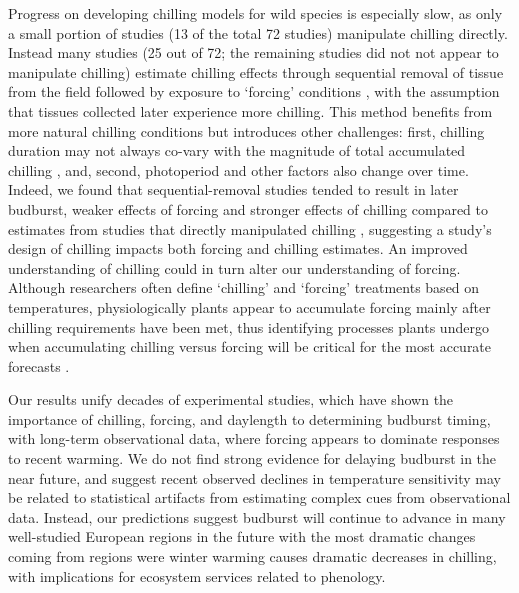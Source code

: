 \documentclass{article}
\begin{document}
\par Progress on developing chilling models for wild species is especially slow, as only a small portion of studies (13 of the total 72 studies) manipulate chilling directly. Instead many studies (25 out of 72; the remaining studies did not not appear to manipulate chilling) estimate chilling effects through sequential removal of tissue from the field followed by exposure to `forcing' conditions \citep{weinberger1950}, with the assumption that tissues collected later experience more chilling. This method benefits from more natural chilling conditions but introduces other challenges: first, chilling duration may not always co-vary with the magnitude of total accumulated chilling \citep{dennis2003}, and, second, photoperiod and other factors also change over time. Indeed, we found that sequential-removal studies tended to result in later budburst, weaker effects of forcing and stronger effects of chilling compared to estimates from studies that directly manipulated chilling \citep[Fig. \ref{fig:weinberger}, Table \ref{tab:methods}][]{weinberger1950,polgar2013}, suggesting a study's design of chilling impacts both forcing and chilling estimates. An improved understanding of chilling could in turn alter our understanding of forcing. Although researchers often define `chilling' and `forcing' treatments based on temperatures, physiologically plants appear to accumulate forcing mainly after chilling requirements have been met, thus identifying processes plants undergo when accumulating chilling versus forcing will be critical for the most accurate forecasts \citep{chuine2016}.


 \par Our results unify decades of experimental studies, which have shown the importance of chilling, forcing, and daylength to determining budburst timing, with long-term observational data, where forcing appears to dominate responses to recent warming. We do not find strong evidence for delaying budburst in the near future, and suggest recent observed declines in temperature sensitivity may be related to statistical artifacts from estimating complex cues from observational data. Instead, our predictions suggest budburst will continue to advance in many well-studied European regions in the future with the most dramatic changes coming from regions were winter warming causes dramatic decreases in chilling, with implications for ecosystem services related to phenology. %
 
\end{document}

